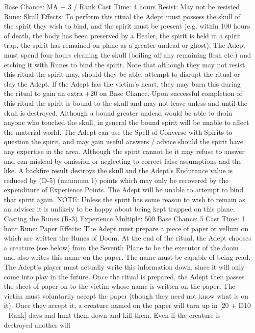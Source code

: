 \documentclass[a4paper]{article}
\begin{document}
\begin{multicols}{3}
Base Chance: MA + 3 / Rank
Cast Time: 4 hours
Resist: May not be resisted
Rune: Skull
Effects: To perform this ritual the Adept must
possess the skull of the spirit they wish to bind, and
the spirit must be present (e.g. within 100 hours of
death, the body has been preserved by a Healer, the
spirit is held in a spirit trap, the spirit has remained
on plane as a greater undead or ghost). The Adept
must spend four hours cleaning the skull (boiling
off any remaining flesh etc.) and etching it with
Runes to bind the spirit. Note that although they
may not resist this ritual the spirit may, should they
be able, attempt to disrupt the ritual or slay the
Adept. If the Adept has the victim’s heart, they
may burn this during the ritual to gain an extra +20
on Base Chance.
Upon successful completion of this ritual the spirit
is bound to the skull and may not leave unless and
until the skull is destroyed. Although a bound
greater undead would be able to drain anyone who
touched the skull, in general the bound spirit will
be unable to affect the material world. The Adept
can use the Spell of Converse with Spirits to question the spirit, and may gain useful answers / advice should the spirit have any expertise in the
area. Although the spirit cannot lie it may refuse to
answer and can mislead by omission or neglecting
to correct false assumptions and the like. A backfire result destroys the skull and the Adept’s Endurance value is reduced by (D-5) (minimum 1)
points which may only be recovered by the expenditure of Experience Points. The Adept will be
unable to attempt to bind that spirit again. NOTE:
Unless the spirit has some reason to wish to remain
as an adviser it is unlikely to be happy about being
kept trapped on this plane.
Casting the Runes (R-3)
Experience Multiple: 500
Base Chance: 5%
Cast Time: 1 hour
Rune: Paper
Effects: The Adept must prepare a piece of paper
or vellum on which are written the Runes of Doom.
At the end of the ritual, the Adept chooses a creature (see below) from the Seventh Plane to be the
executor of the doom and also writes this name on
the paper. The name must be capable of being read.
The Adept’s player must actually write this information down, since it will only come into play in
the future. Once the ritual is prepared, the Adept
then passes the sheet of paper on to the victim
whose name is written on the paper. The victim
must voluntarily accept the paper (though they
need not know what is on it). Once they accept it, a
creature named on the paper will turn up in [20 +
D10 - Rank] days and hunt them down and kill
them. Even if the creature is destroyed another will

\end{multicols}
\end{document}
